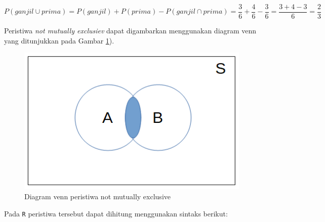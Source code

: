 \documentclass[]{book}
\newenvironment{Shaded}{\begin{snugshade}}{\end{snugshade}}
\newcommand{\KeywordTok}[1]{\textcolor[rgb]{0.13,0.29,0.53}{\textbf{#1}}}
\newcommand{\DecValTok}[1]{\textcolor[rgb]{0.00,0.00,0.81}{#1}}
\newcommand{\StringTok}[1]{\textcolor[rgb]{0.31,0.60,0.02}{#1}}
\newcommand{\CommentTok}[1]{\textcolor[rgb]{0.56,0.35,0.01}{\textit{#1}}}
\newcommand{\OperatorTok}[1]{\textcolor[rgb]{0.81,0.36,0.00}{\textbf{#1}}}
\newcommand{\NormalTok}[1]{#1}
\begin{document}
\[
P\left(ganjil\cup prima\right)=P\left(ganjil\right)+P\left(prima\right)-P\left(ganjil\cap prima\right)=\frac{3}{6}+\frac{4}{6}-\frac{3}{6}=\frac{3+4-3}{6}=\frac{2}{3}
\]

Peristiwa \emph{not mutually exclusiev} dapat digambarkan menggunakan
diagram venn yang ditunjukkan pada Gambar \ref{fig:pnmevis}).

\begin{figure}

{\centering \includegraphics[width=0.8\linewidth]{pnmevis} 

}

\caption{Diagram venn peristiwa not mutually exclusive}\label{fig:pnmevis}
\end{figure}

Pada \texttt{R} peristiwa tersebut dapat dihitung menggunakan sintaks
berikut:

\begin{Shaded}
\end{Shaded}
\end{document}

